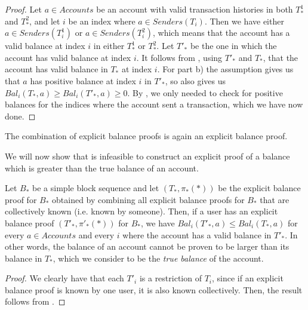 \begin{proof}
  Let \(a \in Accounts\) be an account with valid transaction histories in both \(T^1_*\) and \(T^2_*\), and let \(i\) be an index where \(a \in Senders(T_i)\). Then we have either \(a \in Senders(T^1_i)\) or \(a \in Senders(T^2_i)\), which means that the account has a valid balance at index \(i\) in either \(T^1_*\) or \(T^2_*\). Let \(T'_*\) be the one in which the account has valid balance at index \(i\). It follows from , using \(T'_*\) and \(T_*\), that the account has valid balance in \(T_*\) at index \(i\). For part b) the assumption gives us that \(a\) has positive balance at index \(i\) in \(T'_*\), so  also gives us
  \(Bal_i(T_*,a) \geq Bal_i(T'_*,a) \geq 0.\)
  By , we only needed to check for positive balances for the indices where the account sent a transaction, which we have now done.
\end{proof}

\begin{cor}
  The combination of explicit balance proofs is again an explicit balance proof.
\end{cor}

We will now show that is infeasible to construct an explicit proof of a balance which is greater than the true balance of an account.

\begin{theorem}\label{theorem:explicit-proof-soundness}
Let \(B_*\) be a simple block sequence and let \((T_*,\pi_*(*))\) be the explicit balance proof for \(B_*\) obtained by combining all explicit balance proofs for \(B_*\) that are collectively known (i.e. known by someone). Then, if a user has an explicit balance proof \((T'_*, \pi'_*(*))\) for \(B_*\), we have \(Bal_i(T'_*,a) \leq Bal_i(T_*,a)\) for every \(a \in Accounts\) and every \(i\) where the account has a valid balance in \(T'_*\). In other words, the balance of an account cannot be proven to be larger than its balance in \(T_*\), which we consider to be the \emph{true balance} of the account.
\end{theorem}

\begin{proof}
  We clearly have that each \(T'_i\) is a restriction of \(T_i\), since if an explicit balance proof is known by one user, it is also known collectively. Then, the result follows from .
\end{proof}

